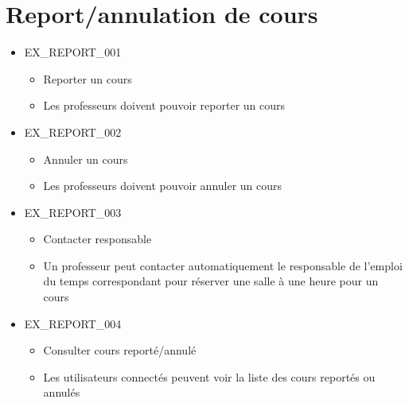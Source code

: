 \documentclass[french]{scrartcl}
\begin{document}
\section{Report/annulation de cours}
    \begin{itemize}
        \item EX\_REPORT\_001
        \begin{itemize}
            \item Reporter un cours
            \item Les professeurs doivent pouvoir reporter un cours
        \end{itemize}
        \item EX\_REPORT\_002
        \begin{itemize}
            \item Annuler un cours
            \item Les professeurs doivent pouvoir annuler un cours
        \end{itemize}
        \item EX\_REPORT\_003
        \begin{itemize}
            \item Contacter responsable
            \item Un professeur peut contacter automatiquement le responsable de l'emploi du temps correspondant pour réserver une salle à une heure pour un cours
        \end{itemize}
        \item EX\_REPORT\_004
        \begin{itemize}
            \item Consulter cours reporté/annulé
            \item Les utilisateurs connectés peuvent voir la liste des cours reportés ou annulés
        \end{itemize}
    \end{itemize}
\end{document}

